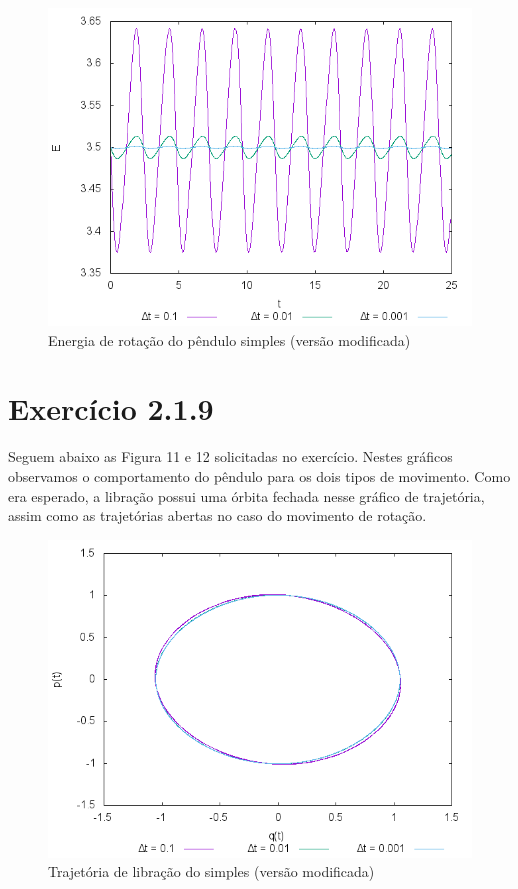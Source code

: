 \documentclass[a4paper,10pt]{article}
\begin{document}
  \begin{figure}[H]
    \centering
    \includegraphics[scale=0.6]{../Programa2/Figura10.png}
    \caption{Energia de rotação do pêndulo simples (versão modificada)}
  \end{figure}

\section*{Exercício 2.1.9}
  Seguem abaixo as Figura 11 e 12 solicitadas no exercício. Nestes gráficos observamos o comportamento do pêndulo para os dois tipos
  de movimento. Como era esperado, a libração possui uma órbita fechada nesse gráfico de trajetória, assim como as trajetórias abertas no
  caso do movimento de rotação.

    \begin{figure}[H]
      \centering
      \includegraphics[scale=0.6]{../Programa2/Figura11.png}
      \caption{Trajetória de libração do simples (versão modificada)}
    \end{figure}
\end{document}
